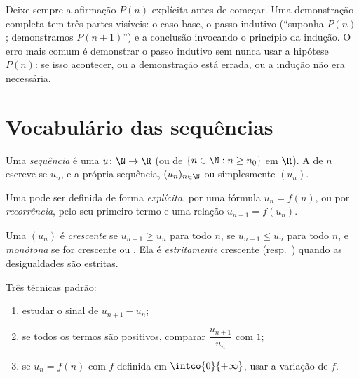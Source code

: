 \begin{method}\label{met:g12:seq:induction}
Deixe sempre a afirmação $P(n)$ explícita antes de começar. Uma
demonstração completa tem três partes visíveis: o caso base, o passo
indutivo (``suponha $P(n)$; demonstramos $P(n+1)$'') e a conclusão
invocando o princípio da indução. O erro mais comum é demonstrar o passo
indutivo sem nunca usar a hipótese $P(n)$: se isso acontecer, ou a
demonstração está errada, ou a indução não era necessária.
\end{method}

\section{Vocabulário das sequências}

\begin{definition}[Sequência]\label{def:g12:seq:sequence}
Uma \emph{sequência} é uma  $u \colon \N \to \R$
(ou de $\{n \in \N : n \geq n_0\}$ em $\R$). A  de $n$ escreve-se
$u_n$, e a própria sequência, $(u_n)_{n\in\N}$ ou simplesmente $(u_n)$.
\end{definition}

Uma  pode ser definida de forma \emph{explícita}, por uma fórmula
$u_n = f(n)$, ou por \emph{recorrência}, pelo seu primeiro termo e uma
relação $u_{n+1} = f(u_n)$.

\begin{definition}[Monotonicidade]\label{def:g12:seq:monotonic}
Uma  $(u_n)$ é \emph{crescente} se
$u_{n+1} \geq u_n$ para todo $n$, \emph{} se
$u_{n+1} \leq u_n$ para todo $n$, e \emph{monótona} se for crescente ou
. Ela é \emph{estritamente} crescente (resp.\ )
quando as desigualdades são estritas.
\end{definition}

\begin{method}\label{met:g12:seq:monotonicity}
Três técnicas padrão:
\begin{enumerate}
  \item estudar o sinal de $u_{n+1} - u_n$;
  \item se todos os termos são positivos, comparar
        $\dfrac{u_{n+1}}{u_n}$ com $1$;
  \item se $u_n = f(n)$ com $f$ definida em $\intco{0}{+\infty}$, usar a
        variação de $f$.
\end{enumerate}
\end{method}

